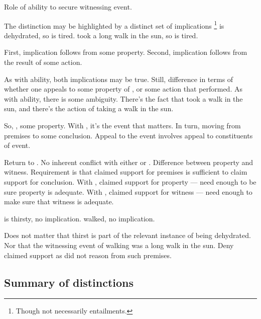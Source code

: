 \begin{note}
  Role of ability to secure witnessing event.

  The distinction may be highlighted by a distinct set of implications\nolinebreak
  \footnote{
    Though not necessarily entailments.
  }
   is dehydrated, so  is tired.
   took a long walk in the sun, so  is tired.

  First, implication follows from some property.
  Second, implication follows from the result of some action.

  As with ability, both implications may be true.
  Still, difference in terms of whether one appeals to some property of , or some action that  performed.
  As with ability, there is some ambiguity.
  There's the fact that  took a walk in the sun, and there's the action of  taking a walk in the sun.
\end{note}

\begin{note}[Why]
  So, \AR{}, some property.
  With \WR{}, it's the event that matters.
  In turn, moving from premises to some conclusion.
  Appeal to the event involves appeal to constituents of event.

  Return to \ESU{}.
  No inherent conflict with either \AR{} or \WR{}.
  Difference between property and witness.
  Requirement is that claimed support for premises is sufficient to claim support for conclusion.
  With \AR{}, claimed support for property --- need enough to be sure property is adequate.
  With \WR{}, claimed support for witness --- need enough to make sure that witness is adequate.

   is thirsty, no implication.
   walked, no implication.

  Does not matter that thirst is part of the relevant instance of being dehydrated.
  Nor that the witnessing event of walking was a long walk in the sun.
  Deny claimed support as did not reason from such premises.
\end{note}

\subsection{Summary of distinctions}
\label{sec:summary-distinctions}

